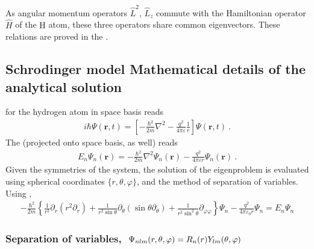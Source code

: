 \documentclass[letterpaper,10pt,english]{jupyterBook}
\begin{document}
\sphinxAtStartPar
{} As angular momentum operators \(\hat{L}^2\), \(\hat{L}_z\) commute with the Hamiltonian operator \(\hat{H}\) of the \(\text{H}\) atom, these three operators share common eigenvectors. These relations are proved in the {\hyperref[\detokenize{ch/quantum-mechanics/atom-models/schrodinger-notes:quantum-mechanics-atom-models-schrodinger-notes}]{}}.

\sphinxstepscope


\subsection{Schrodinger model \sphinxhyphen{} Mathematical details of the analytical solution}
\label{\detokenize{ch/quantum-mechanics/atom-models/schrodinger-analytical-sln:schrodinger-model-mathematical-details-of-the-analytical-solution}}\label{\detokenize{ch/quantum-mechanics/atom-models/schrodinger-analytical-sln:quantum-mechanics-atom-models-schrodinger-analytical-sln}}\label{\detokenize{ch/quantum-mechanics/atom-models/schrodinger-analytical-sln::doc}}
\sphinxAtStartPar
{} for the hydrogen atom in space basis reads
\begin{equation*}
\begin{split}i \hbar \Psi(\mathbf{r},t) = \left[ - \frac{\hbar^2}{2 m} \nabla^2 - \frac{q^2}{4 \pi \varepsilon} \frac{1}{r} \right] \Psi(\mathbf{r},t) \ . \end{split}
\end{equation*}
\sphinxAtStartPar
The  (projected onto space basis, as well) reads
\begin{equation*}
\begin{split}E_n \Psi_n(\mathbf{r}) = - \frac{\hbar^2}{2 m} \nabla^2 \Psi_n(\mathbf{r}) - \frac{q^2}{4 \pi \varepsilon r} \Psi_n(\mathbf{r}) \ .\end{split}
\end{equation*}
\sphinxAtStartPar
Given the symmetries of the system, the solution of the eigenproblem is evaluated using spherical coordinates \(\{ r, \theta, \varphi \}\), and the method of separation of variables. Using ,
\begin{equation*}
\begin{split}- \frac{\hbar^2}{2m} \left\{ \frac{1}{r^2} \partial_r \left( r^2 \partial_r \right) + \frac{1}{r^2 \sin\theta} \partial_\theta \left( \sin\theta \partial_\theta \right) + \frac{1}{r^2 \sin^2\theta} \partial_{\varphi\varphi} \right\} \Psi_n - \frac{q^2}{4\pi \varepsilon_0 r} \Psi_n = E_n \Psi_n\end{split}
\end{equation*}\subsubsection*{Separation of variables, \protect\(\ \Psi_{nlm}(r, \theta, \varphi) = R_n(r) Y_{lm}(\theta, \varphi) \ \protect\) }
\end{document}
